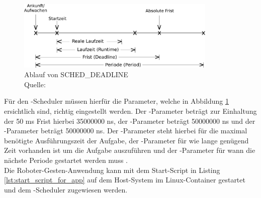 \begin{figure}[htb]
	\centering
	\includegraphics[width=0.85\textwidth]{images/anhang/sched_deadline}
	\caption[Ablauf von SCHED\_DEADLINE]{Ablauf von SCHED\_DEADLINE \\Quelle: \cite{man_sched7_nodate}}
	\label{fig:sched_deadline}
\end{figure}
\FloatBarrier

Für den -Scheduler müssen hierfür die Parameter, welche in Abbildung \ref{fig:sched_deadline} ersichtlich sind, richtig eingestellt werden. Der -Parameter beträgt zur Einhaltung der 50 ms Frist hierbei 35000000 ns, der -Parameter beträgt 50000000 ns und der -Parameter beträgt 50000000 ns. Der -Parameter steht hierbei für die maximal benötigte Ausführungszeit der Aufgabe, der -Parameter für wie lange genügend Zeit vorhanden ist um die Aufgabe auszuführen und der -Parameter für wann die nächste Periode gestartet werden muss \cite{man_sched7_nodate}.\\

Die Roboter-Gesten-Anwendung kann mit dem Start-Script in Listing \ref{lst:start_script_for_app} auf dem Host-System im Linux-Container gestartet und dem -Scheduler zugewiesen werden.\\

